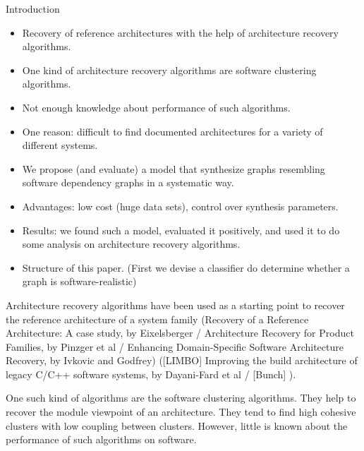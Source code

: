 \documentclass[11pt,twocolumn,a4paper,english]{article}
\begin{document}

\begin{section}{Introduction}

	\begin{itemize}
		\item Recovery of reference architectures with the help of architecture recovery algorithms. 
		\item One kind of architecture recovery algorithms are software clustering algorithms. 
		\item Not enough knowledge about performance of such algorithms.
		\item One reason: difficult to find documented architectures for a variety of different systems.
		\item We propose (and evaluate) a model that synthesize graphs resembling software dependency graphs in a systematic way.
		\item Advantages: low cost (huge data sets), control over synthesis parameters.
		\item Results: we found such a model, evaluated it positively, and used it to do some analysis on architecture recovery algorithms.
		\item Structure of this paper. (First we devise a classifier do determine whether a graph is software-realistic)
	\end{itemize}
		
	Architecture recovery algorithms have been used as a starting point to recover the reference architecture of a system family (Recovery of a Reference Architecture: A case study, by Eixelsberger / Architecture Recovery for Product Families, by Pinzger et al / Enhancing Domain-Specific Software Architecture Recovery, by Ivkovic and Godfrey) 
	([LIMBO] Improving the build architecture of legacy C/C++ software systems, by Dayani-Fard et al / [Bunch] ).
	
	One such kind of algorithms are the software clustering algorithms. They help to recover the module viewpoint of an architecture. They tend to find high cohesive clusters with low coupling between clusters. However, little is known about the performance of such algorithms on software. 
	
\end{section}
\end{document}
